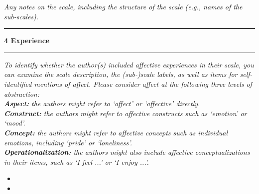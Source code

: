 \documentclass[10pt,a4paper]{protocol}
\newlength{\rulewidth}
\newlength{\ruleandnamegap}
\newcommand{\namefont}{\tiny}
\newcommand{\ruleandname}[2]{%
  \par\noindent
  \rule{#2}{\rulewidth}\par
  \vspace{\dimexpr-\baselineskip+\ruleandnamegap}
  \noindent{\namefont #1}\par
  \addvspace{\baselineskip}
}
\newcommand\category[2]{
{\Large\bfseries\color{emphasis} \vspace{0.25em} #1 \hspace{0.5em} #2 \\ [-0.6em] \rule{\textwidth}{0.4pt} \vspace{0.25em}}
}
\begin{document}
\textit{Any notes on the scale, including the structure of the scale (e.g., names of the sub-scales).}
\vspace{1.5em}
\ruleandname{character string}{10cm}
\divider

\category{4}{Experience}

\textit{To identify whether the author(s) included affective experiences in their scale, you can examine the scale description, the (sub-)scale labels, as well as items for self-identified mentions of affect. Please consider affect at the following three levels of abstraction:\\
\textbf{Aspect:} the authors might refer to `affect' or `affective' directly.\\
\textbf{Construct:} the authors might refer to affective constructs such as `emotion' or `mood'.\\
\textbf{Concept:} the authors might refer to affective concepts such as individual emotions, including `pride' or `loneliness'.\\
\textbf{Operationalization:} the authors might also include affective conceptualizations in their items, such as `I feel ...' or `I enjoy ...'.}
\vspace{0.5em}
\begin{itemize}
	\item {}
	\item {}
\end{itemize}
\divider

\clearpage
\vspace*{2em}
\end{document}
